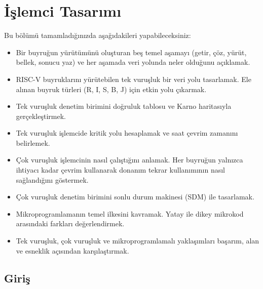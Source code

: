 
\chapter{İşlemci Tasarımı}
\label{chap:islemci-tasarimi}

\begin{tcolorbox}[
    colframe=sinyalyesil!60!black,
    title={\textbf{Öğrenme Hedefleri}},
    fonttitle=\bfseries,
    rounded corners,
    boxrule=0.8pt
]
Bu bölümü tamamladığınızda aşağıdakileri yapabileceksiniz:
\begin{itemize}[nosep, leftmargin=*]
    \item Bir buyruğun yürütümünü oluşturan beş temel aşamayı (getir, çöz, yürüt, bellek, sonucu yaz) ve her aşamada veri yolunda neler olduğunu açıklamak.
    \item RISC-V buyruklarını yürütebilen tek vuruşluk bir veri yolu tasarlamak. Ele alınan buyruk türleri (R, I, S, B, J) için etkin yolu çıkarmak.
    \item Tek vuruşluk denetim birimini doğruluk tablosu ve Karno haritasıyla gerçekleştirmek.
    \item Tek vuruşluk işlemcide kritik yolu hesaplamak ve saat çevrim zamanını belirlemek.
    \item Çok vuruşluk işlemcinin nasıl çalıştığını anlamak. Her buyruğun yalnızca ihtiyacı kadar çevrim kullanarak donanım tekrar kullanımının nasıl sağlandığını göstermek.
    \item Çok vuruşluk denetim birimini sonlu durum makinesi (SDM) ile tasarlamak.
    \item Mikroprogramlamanın temel ilkesini kavramak. Yatay ile dikey mikrokod arasındaki farkları değerlendirmek.
    \item Tek vuruşluk, çok vuruşluk ve mikroprogramlamalı yaklaşımları başarım, alan ve esneklik açısından karşılaştırmak.
\end{itemize}
\end{tcolorbox}

\section*{Giriş}

